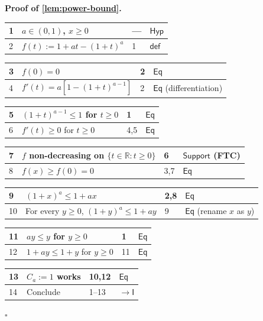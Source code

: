 \documentclass[11pt,reqno]{amsart}
\theoremstyle{blueplain}
\renewcommand{\qedsymbol}{\textcolor{proofqed}{\ensuremath{\square}}}
\renewenvironment{proof}[1][Proof]{\par\noindent\textbf{\textcolor{proofhead}{#1.}}\par\nobreak}{\par\nobreak\hfill\qedsymbol}
\numberwithin{equation}{section}
\begin{document}
\begin{proof}[\textbf{Proof of \cref{lem:power-bound}}]
	\label{proof:lem:power-bound}
	{\scriptsize
		\begin{tabular}{|m{0.7cm}|m{12cm}|m{1.4cm}|m{2.5cm}|}
			\hline
			1 & \(a\in(0,1)\), \(x\ge 0\) & --- & \(\mathsf{Hyp}\) \\ \hline
			2 & \(f(t):=1+at-(1+t)^a\) & 1 & \(\mathsf{def}\) \\
		\end{tabular}%
		\noindent \newline
		\noindent
		\begin{tabular}{|m{0.7cm}|m{12cm}|m{1.4cm}|m{2.5cm}|}
			\hline
			3 & \(f(0)=0\) & 2 & \(\mathsf{Eq}\) \\ \hline
			4 & \(f'(t)=a[1-(1+t)^{a-1}]\) & 2 & \(\mathsf{Eq}\) (differentiation) \\
		\end{tabular}%
		\noindent \newline
		\noindent
		\begin{tabular}{|m{0.7cm}|m{12cm}|m{1.4cm}|m{2.5cm}|}
			\hline
			5 & \((1+t)^{a-1}\le 1\) for \(t\ge 0\) & 1 & \(\mathsf{Eq}\) \\ \hline
			6 & \(f'(t)\ge 0\) for \(t\ge 0\) & 4,5 & \(\mathsf{Eq}\) \\
		\end{tabular}%
		\noindent \newline
		\noindent
		\begin{tabular}{|m{0.7cm}|m{12cm}|m{1.4cm}|m{2.5cm}|}
			\hline
			7 & \(f\) non-decreasing on \(\{t\in\mathbb{R}:t\ge 0\}\) & 6 & \(\mathsf{Support}\) (FTC) \\ \hline
			8 & \(f(x)\ge f(0)=0\) & 3,7 & \(\mathsf{Eq}\) \\
		\end{tabular}%
		\noindent \newline
		\noindent
		\begin{tabular}{|m{0.7cm}|m{12cm}|m{1.4cm}|m{2.5cm}|}
			\hline
			9 & \((1+x)^a\le 1+ax\) & 2,8 & \(\mathsf{Eq}\) \\ \hline
			10 & For every \(y\ge 0\), \((1+y)^a\le 1+ay\) & 9 & \(\mathsf{Eq}\) (rename \(x\) as \(y\)) \\
		\end{tabular}%
		\noindent \newline
		\noindent
		\begin{tabular}{|m{0.7cm}|m{12cm}|m{1.4cm}|m{2.5cm}|}
			\hline
			11 & \(ay\le y\) for \(y\ge 0\) & 1 & \(\mathsf{Eq}\) \\ \hline
			12 & \(1+ay\le 1+y\) for \(y\ge 0\) & 11 & \(\mathsf{Eq}\) \\
		\end{tabular}%
		\noindent \newline
		\noindent
		\begin{tabular}{|m{0.7cm}|m{12cm}|m{1.4cm}|m{2.5cm}|}
			\hline
			13 & \(C_a:=1\) works & 10,12 & \(\mathsf{Eq}\) \\ \hline
			14 & Conclude & 1--13 & \(\rightarrow\mathsf{I}\) \\ \hline
		\end{tabular}%
	}
\end{proof}
\end{document}
